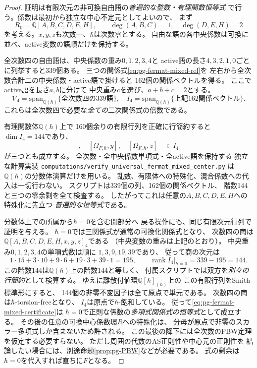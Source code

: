 \begin{proof}
証明は有限次元の非可換自由語の\emph{普遍的な整数・有理関数恒等式}
で行う。係数は最初から独立な中心不定元としてよいので、
まず
\begin{equation}
 R_0=\mathbb Q[A,B,C,D,E,H],\qquad
 \deg(A,B,C)=1,\quad\deg(D,E,H)=2
\end{equation}
を考える。$x,y,z$も次数一、$\hbar$は次数零とする。
自由な語の各中央係数は可換に並べ、active変数の語順だけを保持する。

全次数四の自由語は、中央係数の重み$0,1,2,3,4$と
active語の長さ$4,3,2,1,0$ごとに列挙すると339個ある。
三つの関係式\eqref{eq:pg-fermat-mixed-rel}を
左右から全次数合計二の中央係数・active語で掛けると
162個の関係ベクトルを得る。
ここでactive語を長さ$a,b$に分けて
中央重み$c$を選び、$a+b+c=2$とする。
\begin{equation}
 \mathcal V_4=\mathrm{span}_{\mathbb Q(\hbar)}
  \{\text{全次数四の339語}\},\quad
 I_4=\mathrm{span}_{\mathbb Q(\hbar)}
  \{\text{上記162関係ベクトル}\}.
\end{equation}
これらは全次数四で必要な\emph{全ての}二次関係式の倍数である。

有理関数体$\mathbb Q(\hbar)$上で
160個余りの有限行列を正確に行簡約すると
$\dim I_4=144$であり、
\begin{equation}
 [\Omega_{F,\hbar},x],\quad
 [\Omega_{F,\hbar},y],\quad
 [\Omega_{F,\hbar},z]
 \quad\in I_4
 \label{eq:pg-fermat-mixed-certificate}
\end{equation}
が三つとも成立する。
全次数・全中央係数単項式・全active語を保持する
独立な計算実装
\texttt{computations/verify\_universal\_fermat\_mixed\_center.py}
は$\mathbb Q(\hbar)$の分数体演算だけを用いる。
乱数、有限体への特殊化、混合係数への代入は一切行わない。
スクリプトは339個の列、162個の関係ベクトル、
階数144と三つの零余剰を全て検査する。
したがってこれは任意の$A,B,C,D,E,H$への特殊化に先立つ
\emph{普遍的な恒等式}である。

分数体上での所属から$\hbar=0$を含む開部分へ
戻る操作にも、同じ有限次元行列で証明を与える。
$\hbar=0$では三関係式が通常の可換化関係式となり、
次数四の商は
$\mathbb Q[A,B,C,D,E,H,x,y,z]_4$である
（中央変数の重みは上記のとおり）。
中央重み$0,1,2,3,4$の単項式数は順に
$1,3,9,19,39$であり、
従って商の次元は
\begin{equation}
 1\cdot15+3\cdot10+9\cdot6+19\cdot3+39\cdot1
 =195,\qquad
 \operatorname{rank}I_4|_{\hbar=0}=339-195=144.
\end{equation}
この階数144は$\mathbb Q(\hbar)$上の階数144と等しく、
付属スクリプトでは双方を\emph{別々の行簡約}として検算する。
ゆえに離散付値環$\mathbb Q[\hbar]_{(\hbar)}$上の
この有限行列をSmith標準形にすると、
144個の非零不変因子は全て原点で単元である。
次数四の商は$\hbar$-torsion-freeとなり、
$I_4$は原点で$\hbar$-飽和している。
従って\eqref{eq:pg-fermat-mixed-certificate}は
$\hbar=0$で正則な係数の\emph{多項式関係式の恒等式}として成立する。
その後の任意の可換中心係数環$R$への特殊化は、
分母が原点で非零のスカラー多項式しか含まないため許される。
この最後の降下には全次数のPBW定理を仮定する必要すらない。
ただし周囲の代数のAS正則性や中心元の正則性を
結論したい場合には、別途命題\ref{prop:pg-PBW}などが必要である。
式の剰余は$\hbar=0$を代入すれば直ちに$F$となる。
\end{proof}

